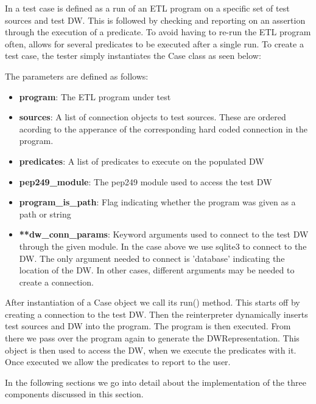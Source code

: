 In \FW{} a test case is defined as a run of an ETL program on a specific set of test sources and test DW. This is followed by checking and reporting on an assertion through the execution of a predicate. To avoid having to re-run the ETL program often, \FW{} allows for several predicates to be executed after a single run. To create a test case, the tester simply instantiates the Case class as seen below:


The parameters are defined as follows:
\begin{itemize}
\item \textbf{program}: The ETL program under test
\item \textbf{sources}: A list of connection objects to test sources. These are ordered acording to the apperance of the corresponding hard coded connection in the program. 
\item \textbf{predicates}: A list of predicates to execute on the populated DW
\item \textbf{pep249\_module}: The pep249 module used to access the test DW
\item \textbf{program\_is\_path}: Flag indicating whether the program was given as a path or string
\item \textbf{**dw\_conn\_params}: Keyword arguments used to connect to the test DW through the given module. In the case above we use sqlite3 to connect to the DW. The only argument needed to connect is 'database' indicating the location of the DW. In other cases, different arguments may be needed to create a connection.
\end{itemize}

After instantiation of a Case object we call its run() method. This starts off by creating a connection to the test DW. Then the reinterpreter dynamically inserts test sources and DW into the program. The program is then executed. From there we pass over the program again to generate the DWRepresentation. This object is then used to access the DW, when we execute the predicates with it. Once executed we allow the predicates to report to the user.

In the following sections we go into detail about the implementation of the three components discussed in this section.








